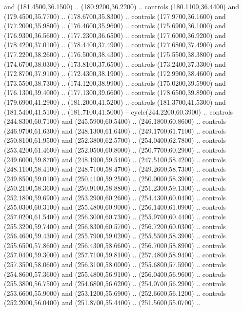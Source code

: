 {\begin{scope}[y=0.80pt, x=0.80pt, yscale=-1, xscale=1, inner sep=0pt, outer sep=0pt, #1]
      and (181.4500,36.1500) .. (180.9200,36.2200) .. controls (180.1100,36.4400)
      and (179.4500,35.7700) .. (178.6700,35.8300) .. controls (177.9700,36.1600)
      and (177.2000,35.9800) .. (176.4600,35.9600) .. controls (175.6900,36.1000)
      and (176.9300,36.5600) .. (177.2300,36.6500) .. controls (177.6000,36.9200)
      and (178.4200,37.0100) .. (178.4400,37.4900) .. controls (177.6800,37.4900)
      and (177.2200,38.2600) .. (176.5000,38.4300) .. controls (175.5500,38.3800)
      and (174.6700,38.0300) .. (173.8100,37.6500) .. controls (173.2400,37.3300)
      and (172.8700,37.9100) .. (172.4300,38.1900) .. controls (172.9900,38.4600)
      and (173.5500,38.7300) .. (174.1200,38.9900) .. controls (175.0200,39.5900)
      and (176.1300,39.4000) .. (177.1300,39.6600) .. controls (178.6500,39.8900)
      and (179.6900,41.2900) .. (181.2000,41.5200) .. controls (181.3700,41.5300)
      and (181.5400,41.5100) .. (181.7100,41.5000) -- cycle(244.2200,60.3900) ..
      controls (244.8300,60.7100) and (245.5900,60.5400) .. (246.1800,60.8600) ..
      controls (246.9700,61.6300) and (248.1300,61.6400) .. (249.1700,61.7100) ..
      controls (250.8100,61.9500) and (252.3800,62.5700) .. (254.0400,62.7800) ..
      controls (253.4200,61.4600) and (252.0500,60.8000) .. (250.7700,60.2900) ..
      controls (249.6000,59.8700) and (248.1900,59.5400) .. (247.5100,58.4200) ..
      controls (248.1100,58.4100) and (248.7100,58.4700) .. (249.2600,58.7300) ..
      controls (249.8500,59.0100) and (250.4100,59.2500) .. (250.0000,58.3900) ..
      controls (250.2100,58.3600) and (250.9100,58.8800) .. (251.2300,59.1300) ..
      controls (252.1800,59.6900) and (253.2900,60.2600) .. (254.4300,60.0400) ..
      controls (255.0300,60.3100) and (255.4800,60.9000) .. (256.1400,61.0900) ..
      controls (257.0200,61.5400) and (256.3000,60.7300) .. (255.9700,60.4400) ..
      controls (255.3200,59.7400) and (256.8300,60.5700) .. (256.7200,60.0300) ..
      controls (256.4600,59.4300) and (255.7900,59.0200) .. (255.5500,58.3900) ..
      controls (255.6500,57.8600) and (256.4300,58.6600) .. (256.7000,58.8900) ..
      controls (257.0400,59.3000) and (257.7100,59.8100) .. (257.4800,58.9400) ..
      controls (257.3500,58.0600) and (256.3100,58.0000) .. (255.6800,57.5900) ..
      controls (254.8600,57.3600) and (255.4800,56.9100) .. (256.0400,56.9600) ..
      controls (255.3800,56.7500) and (254.6800,56.6200) .. (254.0700,56.2900) ..
      controls (253.6600,55.9000) and (253.1200,55.6900) .. (252.6600,56.1200) ..
      controls (252.2000,56.0400) and (251.8700,55.4400) .. (251.5600,55.0700) ..

\end{scope}}
